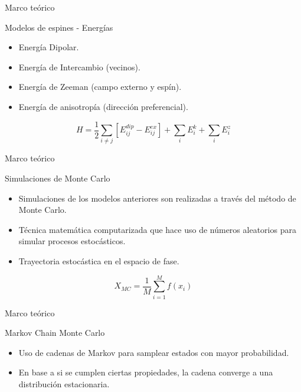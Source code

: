 \begin{frame}{Marco teórico}
\begin{block}{Modelos de espines - Energías}
\begin{itemize}
  \item Energía Dipolar.
  \item Energía de Intercambio (vecinos).
  \item Energía de Zeeman (campo externo y espín).
  \item Energía de anisotropía (dirección preferencial).
\end{itemize}

\begin{equation}
\label{formula:hamiltoniano}
    H = \frac{1}{2} \sum\limits_{i\neq j} [E_{ij}^{dip} - E_{ij}^{ex}] + \sum\limits_{i} E_i^k + \sum\limits_{i} E_i^z
\end{equation}

\end{block}
\end{frame}

\begin{frame}{Marco teórico}
\begin{block}{Simulaciones de Monte Carlo}
\begin{itemize}
  \item Simulaciones de los modelos anteriores son realizadas a través del método de Monte Carlo.
  \item Técnica matemática computarizada que hace uso de números aleatorios para simular procesos estocásticos.
  \item Trayectoria estocástica en el espacio de fase.

\end{itemize}
\begin{equation}
\label{formula:estimacionmontecarlo}
    X_{MC} = \frac{1}{M}\sum\limits_{i=1}^{M} f(x_i)
\end{equation}
\end{block}
\end{frame}

\begin{frame}{Marco teórico}
\begin{block}{Markov Chain Monte Carlo}
\begin{itemize}
  \item Uso de cadenas de Markov para samplear estados con mayor probabilidad.
  \item En base a si se cumplen ciertas propiedades, la cadena converge a una distribución estacionaria.

\end{itemize}
	\centerline{}
\end{block}
\end{frame}

